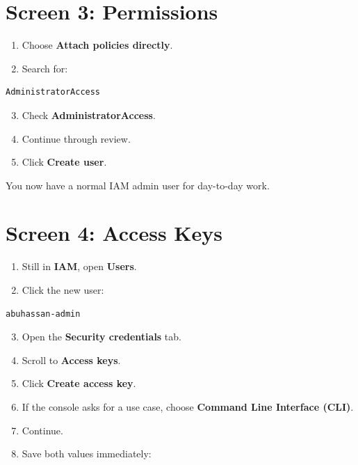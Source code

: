 \documentclass[11pt]{article}
\begin{document}
\section*{Screen 3: Permissions}

\begin{enumerate}
\item Choose \textbf{Attach policies directly}.
\item Search for:
\end{enumerate}

\begin{verbatim}
AdministratorAccess
\end{verbatim}

\begin{enumerate}
\setcounter{enumi}{2}
\item Check \textbf{AdministratorAccess}.
\item Continue through review.
\item Click \textbf{Create user}.
\end{enumerate}

You now have a normal IAM admin user for day-to-day work.

\section*{Screen 4: Access Keys}

\begin{enumerate}
\item Still in \textbf{IAM}, open \textbf{Users}.
\item Click the new user:
\end{enumerate}

\begin{verbatim}
abuhassan-admin
\end{verbatim}

\begin{enumerate}
\setcounter{enumi}{2}
\item Open the \textbf{Security credentials} tab.
\item Scroll to \textbf{Access keys}.
\item Click \textbf{Create access key}.
\item If the console asks for a use case, choose \textbf{Command Line Interface (CLI)}.
\item Continue.
\item Save both values immediately:
\end{enumerate}
\end{document}
